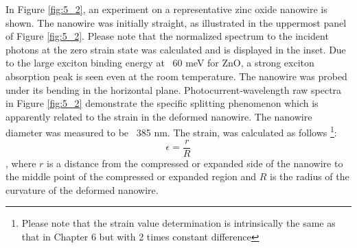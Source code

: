 In Figure \ref{fig:5_2}, an experiment on a representative zinc oxide nanowire is shown. The nanowire was initially straight, as illustrated in the uppermost panel of Figure \ref{fig:5_2}. 
Please note that the normalized spectrum to the incident photons at the zero strain state was calculated and is displayed in the inset. 
Due to the large exciton binding energy at ~60 meV for ZnO, a strong exciton absorption peak is seen even at the room temperature. 
The nanowire was probed under its bending in the horizontal plane. 
Photocurrent-wavelength raw spectra in Figure \ref{fig:5_2} demonstrate the specific splitting phenomenon which is apparently related to the strain in the deformed nanowire. 
The nanowire diameter was measured to be ~385 nm. 
The strain, was calculated as follows \footnote{Please note that the strain value determination is intrinsically the same as that in  Chapter 6 but with  2 times constant difference }: $$\epsilon = \frac{r}{R} $$
, where $r$ is a distance from the compressed or expanded side of the nanowire to the middle point of the compressed or expanded region and $R$ is the radius of the curvature of the deformed nanowire. \\

